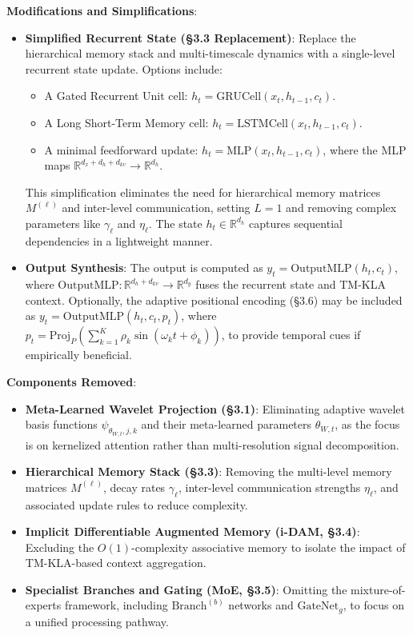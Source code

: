 \documentclass{article}
\begin{document}
\textbf{Modifications and Simplifications}:
\begin{itemize}
    \item \textbf{Simplified Recurrent State (\S3.3 Replacement)}: Replace the hierarchical memory stack and multi-timescale dynamics with a single-level recurrent state update. Options include:
    \begin{itemize}
        \item A Gated Recurrent Unit cell: $h_t = \text{GRUCell}(x_t, h_{t-1}, c_t)$.
        \item A Long Short-Term Memory cell: $h_t = \text{LSTMCell}(x_t, h_{t-1}, c_t)$.
        \item A minimal feedforward update: $h_t = \text{MLP}(x_t, h_{t-1}, c_t)$, where the MLP maps $\mathbb{R}^{d_x + d_h + d_{kv}} \to \mathbb{R}^{d_h}$.
    \end{itemize}
    This simplification eliminates the need for hierarchical memory matrices $M^{(\ell)}$ and inter-level communication, setting $L=1$ and removing complex parameters like $\gamma_\ell$ and $\eta_\ell$. The state $h_t \in \mathbb{R}^{d_h}$ captures sequential dependencies in a lightweight manner.
    \item \textbf{Output Synthesis}: The output is computed as $y_t = \text{OutputMLP}(h_t, c_t)$, where $\text{OutputMLP}: \mathbb{R}^{d_h + d_{kv}} \to \mathbb{R}^{d_y}$ fuses the recurrent state and TM-KLA context. Optionally, the adaptive positional encoding (\S3.6) may be included as $y_t = \text{OutputMLP}(h_t, c_t, p_t)$, where $p_t = \text{Proj}_P\left( \sum_{k=1}^K \rho_k \sin(\omega_k t + \phi_k) \right)$, to provide temporal cues if empirically beneficial.
\end{itemize}

\textbf{Components Removed}:
\begin{itemize}
    \item \textbf{Meta-Learned Wavelet Projection (\S3.1)}: Eliminating adaptive wavelet basis functions $\psi_{\theta_{W,t},j,k}$ and their meta-learned parameters $\theta_{W,t}$, as the focus is on kernelized attention rather than multi-resolution signal decomposition.
    \item \textbf{Hierarchical Memory Stack (\S3.3)}: Removing the multi-level memory matrices $M^{(\ell)}$, decay rates $\gamma_\ell$, inter-level communication strengths $\eta_\ell$, and associated update rules to reduce complexity.
    \item \textbf{Implicit Differentiable Augmented Memory (i-DAM, \S3.4)}: Excluding the $O(1)$-complexity associative memory to isolate the impact of TM-KLA-based context aggregation.
    \item \textbf{Specialist Branches and Gating (MoE, \S3.5)}: Omitting the mixture-of-experts framework, including $\text{Branch}^{(b)}$ networks and $\text{GateNet}_g$, to focus on a unified processing pathway.
\end{itemize}
\end{document}
